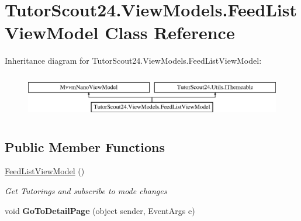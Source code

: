 \hypertarget{class_tutor_scout24_1_1_view_models_1_1_feed_list_view_model}{}\section{Tutor\+Scout24.\+View\+Models.\+Feed\+List\+View\+Model Class Reference}
\label{class_tutor_scout24_1_1_view_models_1_1_feed_list_view_model}
Inheritance diagram for Tutor\+Scout24.\+View\+Models.\+Feed\+List\+View\+Model\+:\begin{figure}[H]
\begin{center}
\leavevmode
\includegraphics[height=1.978799cm]{class_tutor_scout24_1_1_view_models_1_1_feed_list_view_model}
\end{center}
\end{figure}
\subsection*{Public Member Functions}
\begin{DoxyCompactItemize}
\item 
\mbox{\hyperlink{class_tutor_scout24_1_1_view_models_1_1_feed_list_view_model_ab7c9bfdaed22150a2dec3ae737cad158}{Feed\+List\+View\+Model}} ()
\begin{DoxyCompactList}\small\item\em Get Tutorings and subscribe to mode changes \end{DoxyCompactList}\item 
\mbox{\label{class_tutor_scout24_1_1_view_models_1_1_feed_list_view_model_afe013e5b7c2bffd0a429361885bb2d49}} 
void {\bfseries Go\+To\+Detail\+Page} (object sender, Event\+Args e)
\end{DoxyCompactItemize}

